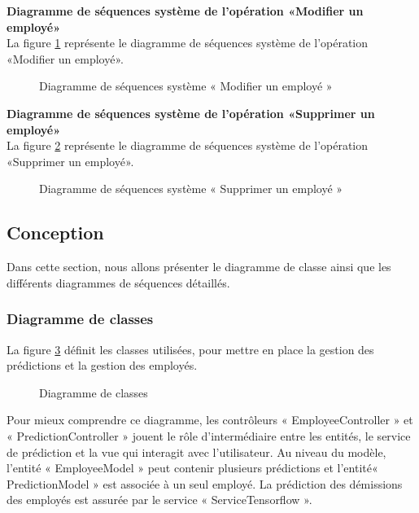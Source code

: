 \newpage
\textbf{Diagramme de séquences système de l’opération «Modifier un employé»}\\
La figure \ref{fig:seqsystemeModifierEmploye} représente le diagramme de séquences système de l’opération «Modifier un employé».
\begin{figure}[htpb]
    \centering
    \caption{Diagramme de séquences système « Modifier un employé »}
    \label{fig:seqsystemeModifierEmploye}
    \end{figure}
\newpage
\textbf{Diagramme de séquences système de l’opération «Supprimer un employé»}\\
La figure \ref{fig:seqsystemeSupprimerEmploye} représente le diagramme de séquences système de l’opération «Supprimer un employé».
\begin{figure}[htpb]
    \centering
    \caption{Diagramme de séquences système « Supprimer un employé »}
    \label{fig:seqsystemeSupprimerEmploye}
    \end{figure}
    

\subsection{Conception}
Dans cette section, nous allons présenter le diagramme de classe ainsi que les différents diagrammes de séquences détaillés.
   \subsubsection{Diagramme de classes}
  La figure \ref{fig:diagclasse3} définit les classes utilisées, pour mettre en place la gestion des prédictions et la gestion des employés.
\newpage

\begin{figure}[htpb]
    \centering
    \caption{Diagramme de classes}
    \label{fig:diagclasse3}
    \end{figure}

Pour mieux comprendre ce diagramme, les contrôleurs « EmployeeController » et \newline « PredictionController » jouent le rôle d'intermédiaire entre les entités, le service de prédiction et la vue qui interagit avec l'utilisateur.\newline
Au niveau du modèle, l'entité « EmployeeModel » peut contenir plusieurs prédictions et l'entité\newline « PredictionModel » est associée à un seul employé.\newline
La prédiction des démissions des employés est assurée par le service « ServiceTensorflow ».
\newpage
